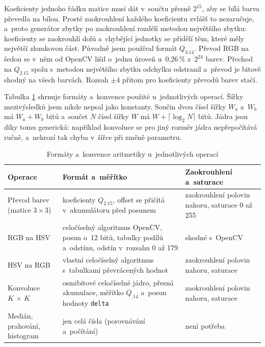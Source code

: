 \documentclass[FM,DP]{tulthesis}
\begin{document}
Koeficienty jednoho řádku matice musí dát v~součtu přesně $2^{15}$, aby se bílá
barva převedla na bílou. Prosté zaokrouhlení každého koeficientu zvlášť to
nezaručuje, a~proto generátor zbytky po zaokrouhlení rozdělí metodou největšího
zbytku: koeficienty se zaokrouhlí dolů a~chybějící jednotky se přidělí těm,
které měly největší zlomkovou část. Původně jsem používal formát $Q_{3.14}$.
Převod RGB na šedou se v~něm od OpenCV lišil o~jednu úroveň u~0,26\,\%
z~$2^{24}$ barev. Přechod na $Q_{2.15}$ spolu s~metodou největšího zbytku
odchylku odstranil a~převod je bitově shodný na všech barvách. Rozsah $\pm 4$
přitom pro koeficienty převodů barev stačí.

Tabulka \ref{tab:formaty} shrnuje formáty a~konvence použité u~jednotlivých
operací. Šířky mezivýsledků jsem nikde nepsal jako konstanty. Součin dvou čísel
šířky $W_a$ a~$W_b$ má $W_a + W_b$ bitů a~součet $N$ čísel šířky $W$ má $W +
    \lceil \log_{2} N \rceil$ bitů. Jádra jsou díky tomu generická: například
konvoluce se pro jiný rozměr jádra nepřepočítává ručně, a~nehrozí tak chyba
v~šířce při změně parametru.

\begin{table}[htbp]
    \centering
    \caption{Formáty a~konvence aritmetiky u~jednotlivých operací}
    \label{tab:formaty}
    \begin{tabular}{p{3.3cm}p{5.2cm}p{5.2cm}}
        \toprule
        Operace                       & Formát a~měřítko                                                                                    & Zaokrouhlení a~saturace                        \\
        \midrule
        Převod barev (matice 3\,×\,3) & koeficienty $Q_{2.15}$, offset se přičítá v~akumulátoru před posunem                                & zaokrouhlení polovin nahoru, saturace 0 až 255 \\
        RGB na HSV                    & celočíselný algoritmus OpenCV, posun o~12 bitů, tabulky podílů a~odstínu, odstín v~rozsahu 0 až 179 & shodné s~OpenCV                                \\
        HSV na RGB                    & vlastní celočíselný algoritmus s~tabulkami převrácených hodnot                                      & zaokrouhlení polovin nahoru, saturace          \\
        Konvoluce $K\,×\,K$           & osmibitové celočíselné jádro, přesná akumulace, měřítko $Q_{.14}$ a~posun hodnoty \texttt{delta}    & zaokrouhlení polovin nahoru, saturace          \\
        Medián, prahování, histogram  & jen celá čísla (porovnávání a~počítání)                                                             & není potřeba                                   \\
        \bottomrule
    \end{tabular}
\end{table}
\end{document}
